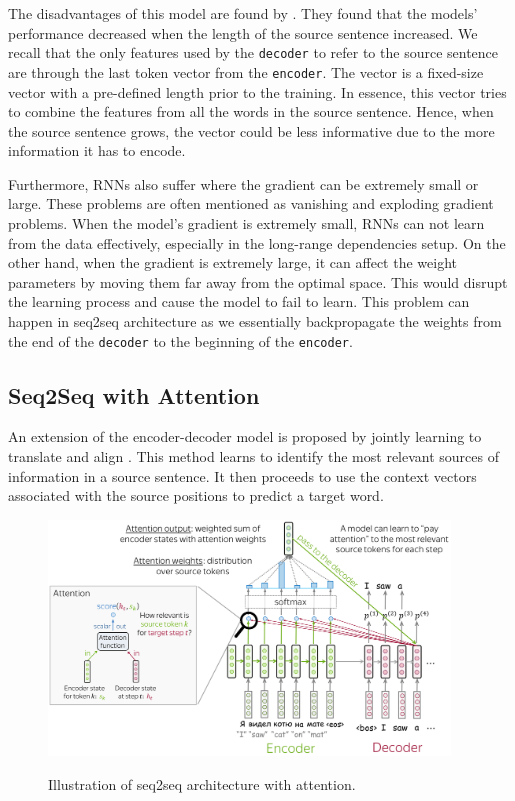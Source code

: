 The disadvantages of this model are found by \cite{cho2014properties}. They found that the models' performance decreased when the length of the source sentence increased. We recall that the only features used by the \texttt{decoder} to refer to the source sentence are through the last token vector from the \texttt{encoder}. The vector is a fixed-size vector with a pre-defined length prior to the training. In essence, this vector tries to combine the features from all the words in the source sentence. Hence, when the source sentence grows, the vector could be less informative due to the more information it has to encode.


Furthermore, RNNs also suffer where the gradient can be extremely small or large. These problems are often mentioned as vanishing and exploding gradient problems. When the model's gradient is extremely small, RNNs can not learn from the data effectively, especially in the long-range dependencies setup. On the other hand, when the gradient is extremely large, it can affect the weight parameters by moving them far away from the optimal space. This would disrupt the learning process and cause the model to fail to learn. This problem can happen in seq2seq architecture as we essentially backpropagate the weights from the end of the \texttt{decoder} to the beginning of the \texttt{encoder}.

\subsection{Seq2Seq with Attention}
An extension of the encoder-decoder model is proposed by jointly learning to translate and align \cite{bahdanau2015nmt}. This method learns to identify the most relevant sources of information in a source sentence. It then proceeds to use the context vectors associated with the source positions to predict a target word.

\begin{figure}[h]
    {\includegraphics[width=0.95\textwidth]{img/attseq2seq.png}}
    \centering
    \caption{Illustration of seq2seq architecture with attention\protect\footnotemark[2].}
    \label{img:attseq2seq}
\end{figure}


